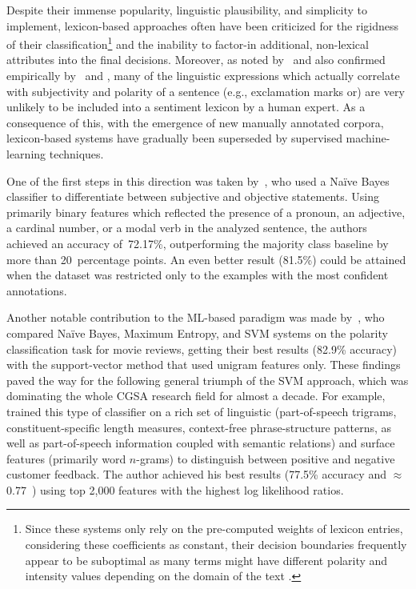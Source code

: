Despite their immense popularity, linguistic plausibility, and
simplicity to implement, lexicon-based approaches often have been
criticized for the rigidness of their classification\footnote{Since
  these systems only rely on the pre-computed weights of lexicon
  entries, considering these coefficients as constant, their decision
  boundaries frequently appear to be suboptimal as many terms might
  have different polarity and intensity values depending on the domain
  of the text \cite[see][]{Eisenstein:17,Yang:17}.} and the inability
to factor-in additional, non-lexical attributes into the final
decisions.  Moreover, as noted by~\citet{Pang:02} and also confirmed
empirically by~\citet{Riloff:03} and \citet{Gamon:04}, many of the
linguistic expressions which actually correlate with subjectivity and
polarity of a sentence (e.g., exclamation marks or) are very unlikely to be included into a
sentiment lexicon by a human expert.  As a consequence of this, with
the emergence of new manually annotated corpora, lexicon-based systems
have gradually been superseded by supervised machine-learning
techniques.

One of the first steps in this direction was taken
by~\citet{Wiebe:99}, who used a Na{\"i}ve Bayes classifier to
differentiate between subjective and objective statements.  Using
primarily binary features which reflected the presence of a pronoun,
an adjective, a cardinal number, or a modal verb in the analyzed
sentence, the authors achieved an accuracy of~72.17\%, outperforming
the majority class baseline by more than 20~percentage points.  An
even better result (81.5\%) could be attained when the dataset was
restricted only to the examples with the most confident annotations.


Another notable contribution to the ML-based paradigm was made
by~\citet{Pang:02}, who compared Na{\"i}ve Bayes, Maximum Entropy, and
SVM systems on the polarity classification task for movie reviews,
getting their best results (82.9\% accuracy) with the support-vector
method that used unigram features only.  These findings paved the way
for the following general triumph of the SVM approach, which was
dominating the whole CGSA research field for almost a decade.  For
example, \citet{Gamon:04} trained this type of classifier on a rich
set of linguistic (part-of-speech trigrams, constituent-specific
length measures, context-free phrase-structure patterns, as well as
part-of-speech information coupled with semantic relations) and
surface features (primarily word $n$-grams) to distinguish between
positive and negative customer feedback.  The author achieved his best
results (77.5\% accuracy and $\approx$0.77~\F) using top 2,000
features with the highest log likelihood
ratios.  %


